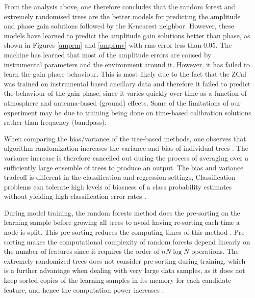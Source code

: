 From the analysis above, one therefore concludes that the random forest and extremely randomised trees are the better models for predicting the amplitude and phase gain solutions followed by the K-nearest neighbor. However, these models have learned to predict the amplitude gain solutions better than phase, as shown in Figures \ref{amprm} and \ref{amprmv} with rms  error less than 0.05. The machine has learned that most of the amplitude errors are caused by instrumental parameters and the environment around it. However, it has failed to learn the gain phase behaviour. This is most likely due to the fact that the ZCal was trained on instrumental based ancillary data and therefore it failed to predict the behaviour of the gain phase, since it varies quickly over time as a function of atmosphere and antenna-based (ground) effects. Some of the limitations of our experiment may be due to training being done on time-based calibration solutions rather than frequency (bandpass). 

When comparing the bias/variance of the tree-based methods, one observes that algorithm randomization increases the variance and bias of individual trees \citep{geurts2006extremely}. The variance increase is therefore cancelled out during the process of averaging over a sufficiently large ensemble of trees to produce an output. The bias and variance tradeoff is different in the classification and regression settings, Classification problems can tolerate high levels of biasness  of a class probability estimates without yielding high classification error rates \citep{geurts2006extremely}. 

During model training, the random forests method does the pre-sorting on the learning sample before growing all trees to avoid having re-sorting  each time a node is split. This pre-sorting reduces the computing times of this method \citep{geurts2006extremely}. Pre-sorting makes the computational complexity of random forests depend linearly on the number of features since it requires the order of $nN\log N$ operations. The extremely randomized trees does not consider pre-sorting during training, which is a further advantage when dealing with very large data samples, as it does not keep sorted copies of the learning samples in its memory for each candidate feature, and hence the computation power increases \citep{geurts2006extremely}.



